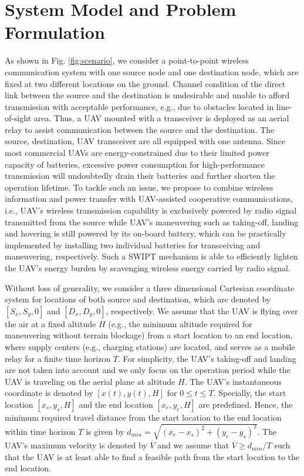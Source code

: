 \documentclass[12pt, draftclsnofoot, onecolumn]{IEEEtran}
\begin{document}
\section{System Model and Problem Formulation}
As shown in Fig. \ref{fig:scenario}, we consider a point-to-point wireless communication system with one source node and one destination node, which are fixed at two different locations on the ground. Channel condition of the direct link between the source and the destination is undesirable and unable to afford transmission with acceptable performance, e.g., due to obstacles located in line-of-sight area. Thus, a UAV mounted with a transceiver is deployed as an aerial relay to assist communication between the source and the destination. The source, destination, UAV transceiver are all equipped with one antenna. Since most commercial UAVs are energy-constrained due to their limited power capacity of batteries, excessive power consumption for high-performance transmission will undoubtedly drain their batteries and further shorten the operation lifetime. To tackle such an issue, we propose to combine wireless information and power transfer with UAV-assisted cooperative communications, i.e., UAV's wireless transmission capability is exclusively powered by radio signal transmitted from the source while UAV's maneuvering such as taking-off, landing and hovering is still powered by its on-board battery, which can be practically implemented by installing two individual batteries for transceiving and maneuvering, respectively. Such a SWIPT mechanism is able to efficiently lighten the UAV's energy burden by scavenging wireless energy carried by radio signal. 



Without loss of generality, we consider a three dimensional Cartesian coordinate system for locations of both source and destination, which are denoted by $[S_{x},S_{y},0]$ and $[D_{x},D_{y},0]$, respectively. We assume that the UAV is flying over the air at a fixed altitude $H$ (e.g., the minimum altitude required for maneuvering without terrain blockage) from a start location to an end location, where supply centers (e.g., charging stations) are located, and serves as a mobile relay for a finite time horizon $T$. For simplicity, the UAV's taking-off and landing are not taken into account and we only focus on the operation period while the UAV is traveling on the aerial plane at altitude $H$. The UAV's instantaneous coordinate is denoted by $[x(t),y(t),H]$ for $0\leq t\leq T$. Specially, the start location $[x_{s},y_{s},H]$ and the end location $[x_{e},y_{e},H]$ are predefined. Hence, the minimum required travel distance from the start location to the end location within time horizon $T$ is given by $d_{min}=\sqrt{(x_{e}-x_{s})^{2}+(y_{e}-y_{s})^{2}}$. The UAV's maximum velocity is denoted by $\overline{V}$ and we assume that $\overline{V}\geq d_{min}/T$ such that the UAV is at least able to find a feasible path from the start location to the end location. 
\end{document}
